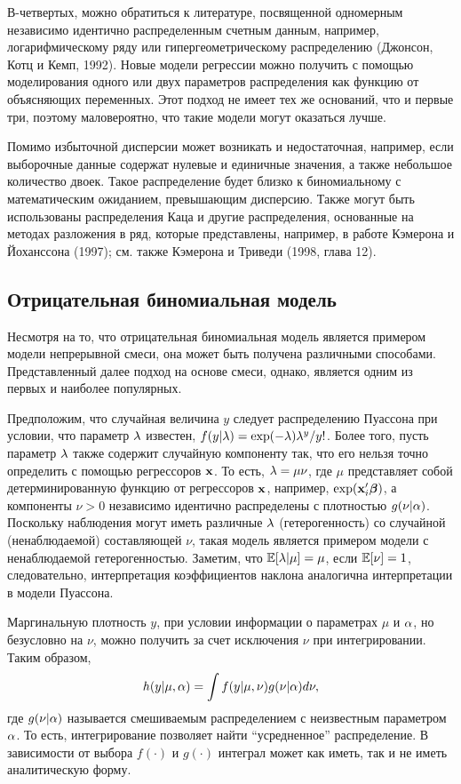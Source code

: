 В-четвертых, можно обратиться к литературе, посвященной одномерным независимо идентично распределенным счетным данным, например, логарифмическому ряду или гипергеометрическому распределению (Джонсон, Котц и Кемп, 1992). Новые модели регрессии можно получить с помощью моделирования одного или двух параметров распределения как функцию от объясняющих переменных. Этот подход не имеет тех же оснований, что и первые три, поэтому маловероятно, что такие модели могут оказаться лучше.

Помимо избыточной дисперсии может возникать и недостаточная, например, если выборочные данные содержат нулевые и единичные значения, а также небольшое количество двоек. Такое распределение будет близко к биномиальному с математическим ожиданием, превышающим дисперсию. Также могут быть использованы распределения Каца и другие распределения, основанные на методах разложения в ряд, которые представлены, например, в работе Кэмерона и Йоханссона (1997); см. также Кэмерона и Триведи (1998, глава 12).


\subsection{Отрицательная биномиальная модель}\label{sec:20.4.1}

\noindent
Несмотря на то, что отрицательная биномиальная модель является примером модели непрерывной смеси, она может быть получена различными способами. Представленный далее подход на основе смеси, однако, является одним из первых и наиболее популярных.

Предположим, что случайная величина $y$ следует распределению Пуассона при условии, что параметр $\lambda$ известен, $f(y|\lambda) = \exp(-\lambda)\lambda^y/y!$. Более того, пусть параметр $\lambda$ также содержит случайную компоненту так, что его нельзя точно определить с помощью регрессоров $\mathbf{x}$. То есть, $\lambda = \mu\nu$, где $\mu$ представляет собой детерминированную функцию от регрессоров $\mathbf{x}$, например, $\exp(\mathbf{x}_i'\bm{\beta})$, а компоненты $\nu > 0$ независимо идентично распределены с плотностью $g(\nu|\alpha)$. Поскольку наблюдения могут иметь различные $\lambda$ (гетерогенность) со случайной (ненаблюдаемой) составляющей $\nu$, такая модель является примером модели с ненаблюдаемой гетерогенностью. Заметим, что $\mathbb{E}[\lambda|\mu] = \mu$, если $\mathbb{E}[\nu] = 1$, следовательно, интерпретация коэффициентов наклона аналогична интерпретации в модели Пуассона.

Маргинальную плотность $y$, при условии информации о параметрах $\mu$ и $\alpha$, но безусловно на $\nu$, можно получить за счет исключения $\nu$ при интегрировании. Таким образом,
    \begin{align}\label{eq:20.11}
    h(y|\mu,\alpha) = \int f(y|\mu, \nu) g(\nu|\alpha) d\nu,
    \end{align}
где $g(\nu|\alpha)$ называется смешиваемым распределением с неизвестным параметром $\alpha$. То есть, интегрирование позволяет найти ``усредненное'' распределение. В зависимости от выбора $f(\cdot)$ и $g(\cdot)$ интеграл может как иметь, так и не иметь аналитическую форму.

